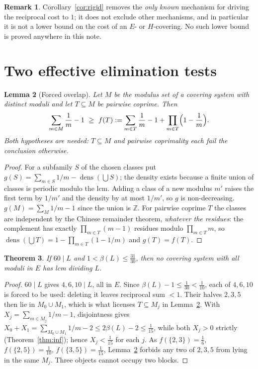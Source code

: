 \documentclass[11pt]{article}
\newtheorem{theorem}{Theorem}
\newtheorem{lemma}[theorem]{Lemma}
\theoremstyle{definition}
\newtheorem{remark}[theorem]{Remark}
\begin{document}
\begin{remark}
Corollary~\ref{cor:rigid} removes the \emph{only known} mechanism for driving the reciprocal cost
to $1$; it does not exclude other mechanisms, and in particular it is not a lower bound on the cost
of an $E$- or $H$-covering. No such lower bound is proved anywhere in this note.
\end{remark}

\section{Two effective elimination tests}

\begin{lemma}[Forced overlap]\label{lem:A2}
Let $M$ be the modulus set of a covering system with distinct moduli and let $T\subseteq M$ be
pairwise coprime. Then
\[
\sum_{m\in M}\frac1m-1\ \ge\ f(T):=\sum_{m\in T}\frac1m-1+\prod_{m\in T}\Bigl(1-\frac1m\Bigr).
\]
Both hypotheses are needed: $T\subseteq M$ and pairwise coprimality each fail the conclusion
otherwise.
\end{lemma}

\begin{proof}
For a subfamily $S$ of the chosen classes put $g(S)=\sum_{m\in S}1/m-\operatorname{dens}(\bigcup S)$;
the density exists because a finite union of classes is periodic modulo the lcm. Adding a class of
a new modulus $m'$ raises the first term by $1/m'$ and the density by at most $1/m'$, so $g$ is
non-decreasing. $g(M)=\sum_M 1/m-1$ since the union is $\mathbb Z$. For pairwise coprime $T$ the
classes are independent by the Chinese remainder theorem, \emph{whatever the residues}: the
complement has exactly $\prod_{m\in T}(m-1)$ residues modulo $\prod_{m\in T}m$, so
$\operatorname{dens}(\bigcup T)=1-\prod_{m\in T}(1-1/m)$ and $g(T)=f(T)$.
\end{proof}

\begin{theorem}\label{thm:A3}
If $60\mid L$ and $1<\beta(L)\le\frac{31}{30}$, then no covering system with all moduli in $E$ has
lcm dividing $L$.
\end{theorem}

\begin{proof}
$60\mid L$ gives $4,6,10\mid L$, all in $E$. Since $\beta(L)-1\le\frac1{30}<\frac1{10}$, each of
$4,6,10$ is forced to be used: deleting it leaves reciprocal sum $<1$. Their halves $2,3,5$ then
lie in $M_0\cup M_1$, which is what licenses $T\subseteq M_j$ in Lemma~\ref{lem:A2}. With
$X_j=\sum_{m\in M_j}1/m-1$, disjointness gives $X_0+X_1=\sum_{M_0\cup M_1}1/m-2\le 2\beta(L)-2
\le\frac1{15}$, while both $X_j>0$ strictly (Theorem~\ref{thm:inf}); hence $X_j<\frac1{15}$ for
each $j$. As $f(\{2,3\})=\frac16$, $f(\{2,5\})=\frac1{10}$, $f(\{3,5\})=\frac1{15}$,
Lemma~\ref{lem:A2} forbids any two of $2,3,5$ from lying in the same $M_j$. Three objects cannot
occupy two blocks.
\end{proof}
\end{document}
